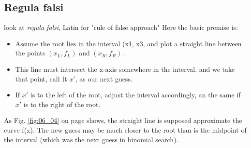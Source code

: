 \subsection{Regula falsi}

 look at \textit{regula falsi}, Latin for "rule of false approach" Here the basic premise is:

\begin{itemize}
    \item Assume the root lies in the interval (x1, x3, and plot a straight line between the points $(x_L, f_L)$ and $(x_R, f_R)$.

    \item This line must intersect the x-axis somewhere in the interval, and we take that point, call It $x'$, as our next guess.

    \item If $x'$ is to the left of the root, adjust the interval accordingly, an the same if $x'$ is to the right of the root.
\end{itemize}

As Fig. \ref{fig:06_04} on page \pageref{fig:06_04} shows, the straight line is supposed
approximate the curve f(x). The new guess may be much closer to the root than is the midpoint of the interval (which was the next guess in binomial search).

